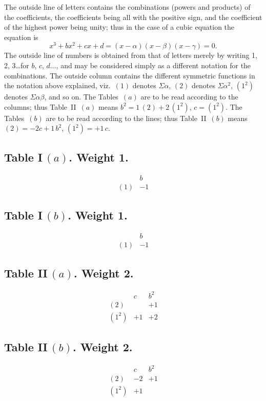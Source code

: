 \documentclass[11pt,a4paper]{book}
\begin{document}
\begin{center}
The outside line of letters contains the combinations (powers and products) of
the coefficients, the coefficients being all with the positive sign, and the
coefficient of the highest power being unity; thus in the case of a cubic
equation the equation is
\[
x^3 + bx^2 + cx + d = (x - \alpha)(x - \beta)(x - \gamma) = 0.
\]
The outside line of numbers is obtained from that of letters merely by writing
1, 2, 3\ldots for $b$, $c$, $d\ldots$, and may be considered simply as a
different notation for the combinations. The outside column contains the
different symmetric functions in the notation above explained, viz.\ $(1)$
denotes $\Sigma\alpha$, $(2)$ denotes $\Sigma\alpha^2$, $(1^2)$ denotes
$\Sigma\alpha\beta$, and so on. The Tables~$(a)$ are to be read according to
the columns; thus Table~II~$(a)$ means $b^2 = 1\,(2) + 2\,(1^2)$,
$c = (1^2)$. The Tables~$(b)$ are to be read according to the lines; thus
Table~II~$(b)$ means $(2) = -2c + 1\,b^2$, $(1^2) = +1\,c$.

\newpage
\subsection*{Table I\,$(a)$. Weight 1.}
\[
\begin{array}{c|c}
& b \\ \hline
(1) & -1
\end{array}
\]

\subsection*{Table I\,$(b)$. Weight 1.}
\[
\begin{array}{c|c}
& b \\ \hline
(1) & -1
\end{array}
\]

\subsection*{Table II\,$(a)$. Weight 2.}
\[
\begin{array}{c|cc}
& c & b^2 \\ \hline
(2) & & +1 \\
(1^2) & +1 & +2
\end{array}
\]

\subsection*{Table II\,$(b)$. Weight 2.}
\[
\begin{array}{c|cc}
& c & b^2 \\ \hline
(2) & -2 & +1 \\
(1^2) & +1 &
\end{array}
\]


\end{center}
\end{document}
